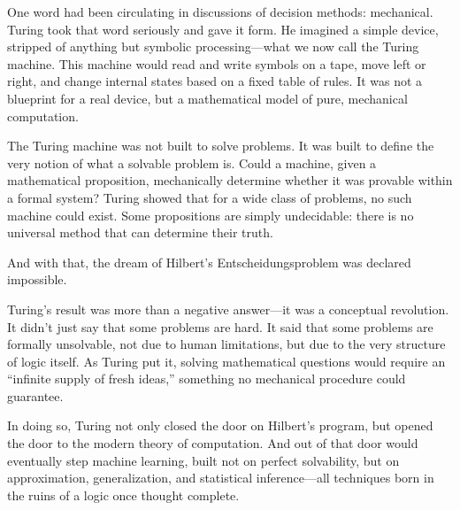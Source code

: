 One word had been circulating in discussions of decision methods: mechanical. Turing took that word seriously and gave it form. He imagined a simple device, stripped of anything but symbolic processing—what we now call the Turing machine. This machine would read and write symbols on a tape, move left or right, and change internal states based on a fixed table of rules. It was not a blueprint for a real device, but a mathematical model of pure, mechanical computation.

The Turing machine was not built to solve problems. It was built to define the very notion of what a solvable problem is. Could a machine, given a mathematical proposition, mechanically determine whether it was provable within a formal system? Turing showed that for a wide class of problems, no such machine could exist. Some propositions are simply undecidable: there is no universal method that can determine their truth.

And with that, the dream of Hilbert’s Entscheidungsproblem was declared impossible.

Turing's result was more than a negative answer—it was a conceptual revolution. It didn’t just say that some problems are hard. It said that some problems are formally unsolvable, not due to human limitations, but due to the very structure of logic itself. As Turing put it, solving mathematical questions would require an “infinite supply of fresh ideas,” something no mechanical procedure could guarantee.

In doing so, Turing not only closed the door on Hilbert’s program, but opened the door to the modern theory of computation. And out of that door would eventually step machine learning, built not on perfect solvability, but on approximation, generalization, and statistical inference—all techniques born in the ruins of a logic once thought complete.